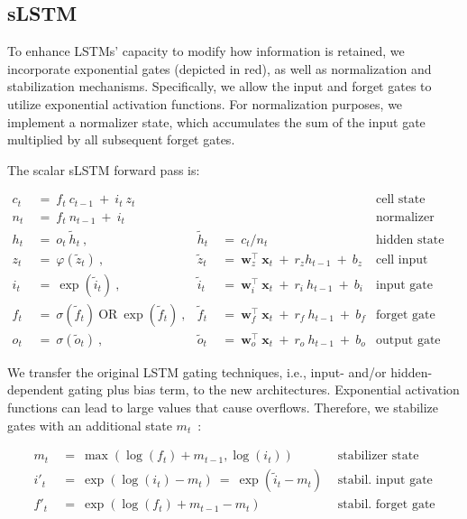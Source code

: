 \subsection{sLSTM}
\label{sec:sLSTM}

To enhance LSTMs' capacity to modify how information is retained, we incorporate exponential gates (depicted in red), as well as normalization and stabilization mechanisms. Specifically, we allow the input and forget gates to utilize exponential activation functions. For normalization purposes, we implement a normalizer state, which accumulates the sum of the input gate multiplied by all subsequent forget gates.

The scalar sLSTM forward pass is:

\begin{align}
\label{eq:slstmforward}
c_t \ &= \  f_t \ c_{t-1} \ + \ i_t \ z_t & & 
 &\text{cell state} \\
n_t \ &= \  f_t \ n_{t-1} \ + \ i_t  & & 
 &\text{normalizer state} \\
h_t \ &= \ o_t \ \tilde{h}_t \ ,
  &\tilde{h}_t \ &= \ c_t / n_t
&\text{hidden state} \\
z_t \ &= \ \varphi \left( \tilde{z}_t \right) \ , 
  &\tilde{z}_t \ &=  \ \mathbf{w}^\top_{z} \ \mathbf{x}_t \ + \
  r_{z}  h_{t-1} \ + \  b_{z}
  &\text{cell input} \\
i_t \ &= \ \!\exp \left( \tilde{i}_t  \right) \ , 
  &\tilde{i}_t \ &= \ \mathbf{w}^\top_{i} \ \mathbf{x}_t \ + \
  r_{i}  \ h_{t-1} \ + \  b_{i}
  &\text{input gate} \\
f_t \ &= \ \sigma \left(  \tilde{f}_t \right) \ \text{OR} \
\!\exp \left(  \tilde{f}_t \right) \ ,
  &\tilde{f}_t \ &= \ \mathbf{w}^\top_{f} \ \mathbf{x}_t  \ + \
  r_{f}  \ h_{t-1} \ + \  b_{f}
  &\text{forget gate} \\
o_t \ &= \ \sigma \left( \tilde{o}_t \right) \ , 
  &\tilde{o}_t  \ &= \ \mathbf{w}^\top_{o} \ \mathbf{x}_t \ + \
  r_{o}  \ h_{t-1} \ + \  b_{o}
  &\text{output gate} 
\end{align}

We transfer the original LSTM gating techniques, i.e., input- and/or hidden-dependent gating plus bias term, to the new architectures. Exponential activation functions can lead to large values that cause overflows. Therefore, we stabilize gates with an additional state \mbox{$m_t$~\citep{Milakov:18arxiv}}:

\begin{align}
\label{eq:slstmstabil}
m_t \ &= \ \max \left( \log ( f_t ) + m_{t-1} , \log ( i_t ) \right) &\text{stabilizer state} \\
i'_t \ &= \ \!\exp \left( \log \left ( i_t \right) - m_t \right) \ = \ \!\exp \left( \tilde{i}_t - m_t \right) \ \, 
  &\text{stabil. input gate} \\
f'_t \ &= \ \!\exp \left( \log \left( f_t \right) + m_{t-1} - m_t \right) \ \, 
  &\text{stabil. forget gate}
\end{align}

